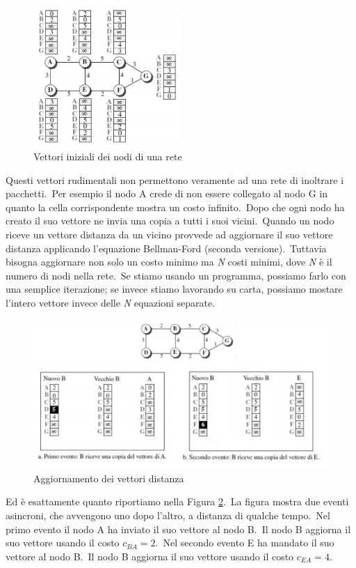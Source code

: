 \begin{figure}[H]
    \centering
    \includegraphics[width=0.5\textwidth]{immagini/Vettori_distanza.jpg}
    \caption{Vettori iniziali dei nodi di una rete}
    \label{Vettori}
\end{figure}
Questi vettori rudimentali non permettono veramente ad una rete di inoltrare i pacchetti.\
Per esempio il nodo A crede di non essere collegato al nodo G in quanto la cella corrispondente mostra un costo infinito.\
Dopo che ogni nodo ha creato il suo vettore ne invia una copia a tutti i suoi vicini.\
Quando un nodo riceve un vettore distanza da un vicino provvede ad aggiornare il suo vettore distanza applicando l'equazione Bellman-Ford (seconda versione).\
Tuttavia bisogna aggiornare non solo un costo minimo ma \emph{N} costi minimi, dove \emph{N} è il numero di nodi nella rete.\
Se stiamo usando un programma, possiamo farlo con una semplice iterazione; se invece stiamo lavorando su carta, possiamo mostare l'intero vettore invece delle \emph{N} equazioni separate.
\begin{figure}[H]
    \centering
    \includegraphics[width=\textwidth]{immagini/Aggiornamento_vettore_distanza.jpg}
    \caption {Aggiornamento dei vettori distanza}
    \label{aggiornamento}
\end{figure}
Ed è esattamente quanto riportiamo nella Figura \ref{aggiornamento}.\
La figura mostra due eventi asincroni, che avvengono uno dopo l'altro, a distanza di qualche tempo.\
Nel primo evento il nodo A ha inviato il suo vettore al nodo B.\
Il nodo B aggiorna il suo vettore usando il costo $c_{BA} = 2$.\
Nel secondo evento E ha mandato il suo vettore al nodo B.\
Il nodo B aggiorna il suo vettore usando il costo $c_{EA} = 4$.

